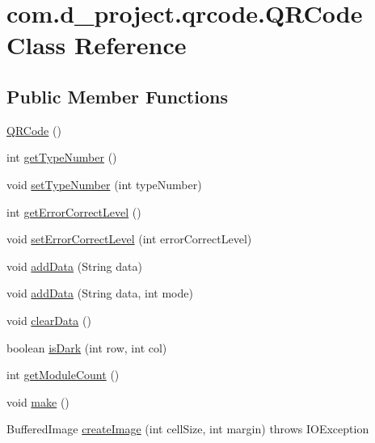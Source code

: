 \hypertarget{classcom_1_1d__project_1_1qrcode_1_1_q_r_code}{}\section{com.\+d\+\_\+project.\+qrcode.\+Q\+R\+Code Class Reference}
\label{classcom_1_1d__project_1_1qrcode_1_1_q_r_code}
\subsection*{Public Member Functions}
\begin{DoxyCompactItemize}
\item 
\hyperlink{classcom_1_1d__project_1_1qrcode_1_1_q_r_code_a699e462d3798ba2108fb799663ad33d0}{Q\+R\+Code} ()
\item 
int \hyperlink{classcom_1_1d__project_1_1qrcode_1_1_q_r_code_af6f185ec98bccbd9cc31afece4da1502}{get\+Type\+Number} ()
\item 
void \hyperlink{classcom_1_1d__project_1_1qrcode_1_1_q_r_code_aa782d70c42402337b427e832693dce85}{set\+Type\+Number} (int type\+Number)
\item 
int \hyperlink{classcom_1_1d__project_1_1qrcode_1_1_q_r_code_a9b1f2ec05c5c1aea9511eb59e667e142}{get\+Error\+Correct\+Level} ()
\item 
void \hyperlink{classcom_1_1d__project_1_1qrcode_1_1_q_r_code_a546e3cb567be9ab0b5c0a76e6affaea0}{set\+Error\+Correct\+Level} (int error\+Correct\+Level)
\item 
void \hyperlink{classcom_1_1d__project_1_1qrcode_1_1_q_r_code_a72e943bfffcf27b05e7a25e4fc66f1c7}{add\+Data} (String data)
\item 
void \hyperlink{classcom_1_1d__project_1_1qrcode_1_1_q_r_code_a72202b3b8879939138329b105340b6a2}{add\+Data} (String data, int mode)
\item 
void \hyperlink{classcom_1_1d__project_1_1qrcode_1_1_q_r_code_a0d24014f5527224c63e13a6f671e8365}{clear\+Data} ()
\item 
boolean \hyperlink{classcom_1_1d__project_1_1qrcode_1_1_q_r_code_a9e31b998c5437dd6780b3c0d4ec97497}{is\+Dark} (int row, int col)
\item 
int \hyperlink{classcom_1_1d__project_1_1qrcode_1_1_q_r_code_a3cb1e7626961e1e5f02e249cc4dfb9f7}{get\+Module\+Count} ()
\item 
void \hyperlink{classcom_1_1d__project_1_1qrcode_1_1_q_r_code_a7e01d7c43b72d913ef3e3369bb8af4df}{make} ()
\item 
Buffered\+Image \hyperlink{classcom_1_1d__project_1_1qrcode_1_1_q_r_code_a7b60e442e66eef831ba7c7dcf6c25245}{create\+Image} (int cell\+Size, int margin)  throws I\+O\+Exception 
\end{DoxyCompactItemize}
